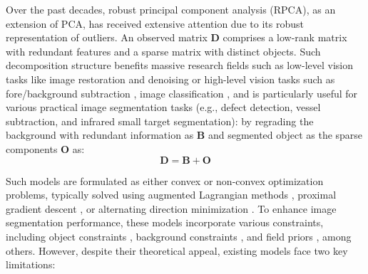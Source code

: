\documentclass[10pt,journal,compsoc]{IEEEtran}
\begin{document}
%
\IEEEpeerreviewmaketitle

\ifCLASSOPTIONcompsoc
{}
\else
\label{sec:introduction}
\fi
Over the past decades, robust principal component analysis (RPCA), as an extension of PCA, has received extensive attention due to its robust representation of outliers. An observed matrix $\mathbf{D}$ comprises a low-rank matrix with redundant features and a sparse matrix with distinct objects. Such decomposition structure benefits massive research fields \cite{bouwmans-2018-rpca} such as low-level vision tasks like image restoration \cite{ji-2011-robust} and denoising \cite{zhao-2014-hyperspectral} or high-level vision tasks such as fore/background subtraction \cite{liu-2015-background}, image classification \cite{zhang2011image}, and is particularly useful for various practical image segmentation tasks (e.g., defect detection, vessel subtraction, and infrared small target segmentation): by regrading the background with redundant information as $\mathbf{B}$ and segmented object as the sparse components $\mathbf{O}$ as:
\begin{equation}
    \mathbf{D} = \mathbf{B} + \mathbf{O}
\label{eq_org}
\end{equation}

Such models are formulated as either convex \cite{wright-2009-robust,zhou-2010-pcp} or non-convex \cite{netrapalli2014non,zhang-2018-nram,wang2021surface} optimization problems, typically solved using augmented Lagrangian methods \cite{candes-2011-rpca}, proximal gradient descent \cite{yi-2016-fast}, or alternating direction minimization \cite{yuan-2009-sparse}. To enhance image segmentation performance, these models incorporate various constraints, including object constraints \cite{cui2012groupsparse,peng2016salient,zhang-2019-nolc}, background constraints \cite{zhu2020tnlrs,xie2016weighted,xia2019vessel}, and field priors \cite{shen2012unified,zhou2012moving,zhu2019infrared}, among others. However, despite their theoretical appeal, existing models face two key limitations:
\end{document}
